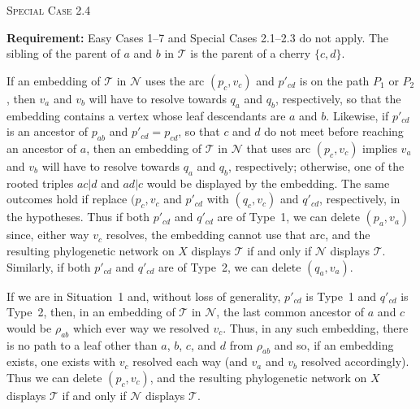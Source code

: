 \documentclass[11pt]{amsart}
\begin{document}
\begin{algorithm}[H]\label{SC2.4}
 \caption{\textsc{Special Case 2.4}}
\begin{algorithmic}[1]
 \Statex\textbf{Requirement:} Easy Cases 1--7 and Special Cases 2.1--2.3 do not apply. The sibling of the parent of $a$ and $b$ in ${{\mathcal T}}$ is the parent of a cherry $\{c, d\}$.
 \end{algorithmic}
\end{algorithm}

If an embedding of ${{\mathcal T}}$ in ${{\mathcal N}}$ uses the arc $(p_c, v_c)$ and $p'_{cd}$ is on the path $P_1$ or $P_2$, then $v_a$ and $v_b$ will have to resolve towards $q_a$ and $q_b$, respectively, so that the embedding contains a vertex whose leaf descendants are $a$ and $b$. Likewise, if $p'_{cd}$ is an ancestor of $p_{ab}$ and $p'_{cd}=p_{cd}$, so that $c$ and $d$ do not meet before reaching an ancestor of $a$, then an embedding of ${{\mathcal T}}$ in ${{\mathcal N}}$ that uses arc $(p_c, v_c)$ implies $v_a$ and $v_b$ will have to resolve towards $q_a$ and $q_b$, respectively; otherwise, one of the rooted triples $ac|d$ and $ad|c$ would be displayed by the embedding. The same outcomes hold if replace $(p_c, v_c$ and $p'_{cd}$ with $(q_c, v_c)$ and $q'_{cd}$, respectively, in the hypotheses. Thus if both $p'_{cd}$ and $q'_{cd}$ are of Type~1, we can delete $(p_a, v_a)$ since, either way $v_c$ resolves, the embedding cannot use that arc, and the resulting phylogenetic network on $X$ displays ${{\mathcal T}}$ if and only if ${{\mathcal N}}$ displays ${{\mathcal T}}$. Similarly, if both $p'_{cd}$ and $q'_{cd}$ are of Type~2, we can delete $(q_a,v_a)$.

If we are in Situation~1 and, without loss of generality, $p'_{cd}$ is Type~1 and $q'_{cd}$ is Type~2, then, in an embedding of ${{\mathcal T}}$ in ${{\mathcal N}}$, the last common ancestor of $a$ and $c$ would be $\rho_{ab}$ which ever way we resolved $v_c$. Thus, in any such embedding, there is no path to a leaf other than $a$, $b$, $c$, and $d$ from $\rho_{ab}$ and so, if an embedding exists, one exists with $v_c$ resolved each way (and $v_a$ and $v_b$ resolved accordingly). Thus we can delete $(p_c, v_c)$, and the resulting phylogenetic network on $X$ displays ${{\mathcal T}}$ if and only if ${{\mathcal N}}$ displays ${{\mathcal T}}$.
\end{document}
